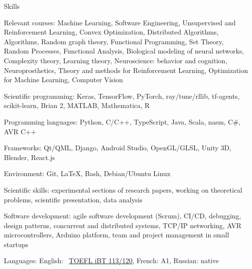 \documentclass{resume} %
\newcommand*{\img}[1]{%
	\raisebox{-.02\baselineskip}{%
		\texttt{[image: \#1]}%
	}%
}
\newcommand*{\emoji}[1]{\img{./emoji/\imgpref#1.png}}
\newcommand*{\mybold}[1]{{\color{pinkunderline} #1}}
\newcommand*{\myboldq}[1]{{#1}}
\def\imgpref{bleak-}
\newcommand{\mylink}{{\color{gray}\faExternalLink}}
\begin{document}
\begin{rSection}{Skills}
	\vspace{-1em}
	\item \myboldq{Relevant courses:} \mybold{Machine Learning, Software Engineering,} {\small Unsupervised and Reinforcement Learning, Convex Optimization, Distributed Algorithms, Algorithms, Random graph theory, Functional Programming, Set Theory, Random Processes, Functional Analysis, Biological modeling of neural networks, Complexity theory, Learning theory, Neuroscience: behavior and cognition, Neuroprosthetics, Theory and methods for Reinforcement Learning, Optimization for Machine Learning, Computer Vision}
	\item \myboldq{Scientific programming:} \mybold{Keras, TensorFlow, PyTorch,} ray/tune/rllib, tf-agents, scikit-learn, Brian 2, MATLAB, Mathematica, R
	\item \myboldq{Programming languages:} \mybold{Python, C/C++}, TypeScript, Java, {\small Scala, nasm, C\#, AVR C++}
	\item \myboldq{Frameworks:} Qt/QML, Django, {\small Android Studio, OpenGL/GLSL, Unity 3D, Blender, React.js}
	\item \myboldq{Environment:} \mybold{Git, \LaTeX, Bash, Debian/Ubuntu Linux}
	\item \myboldq{Scientific skills:} \mybold{experimental} sections of research papers, working on \mybold{theoretical} problems, scientific presentation, data analysis
	\item \myboldq{Software development:} \mybold{agile} software development (Scrum), CI/CD, debugging, design patterns, concurrent and distributed systems, {\small TCP/IP networking, AVR microcontrollers, Arduino platform, team and project management in \mybold{small startups}}
	\item \myboldq{Languages:} \emoji{flag-us} English: \mylink~\href{https://sergia-ch.github.io/epfl/TOEFL.pdf}{TOEFL iBT \mybold{113}/120}, {\small \emoji{flag-fr} French: A1, \emoji{flag-ru} Russian: native}
\end{rSection}
\end{document}
